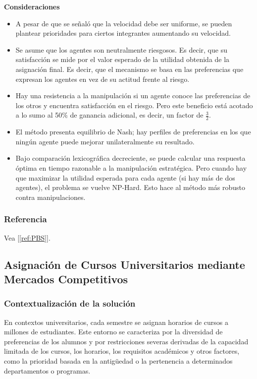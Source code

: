 \documentclass{article}
\begin{document}
\textbf{Consideraciones}

\begin{itemize}
  \item A pesar de que se señaló que la velocidad debe ser uniforme, se pueden plantear prioridades para
        ciertos integrantes aumentando su velocidad.
  \item Se asume que los agentes son neutralmente riesgosos. Es decir, que su satisfacción se mide 
        por el valor esperado de la utilidad obtenida de la asignación final. Es decir, que el mecanismo
        se basa en las preferencias que expresan los agentes en vez de su actitud frente al riesgo.
  \item Hay una resistencia a la manipulación si un agente conoce las preferencias de los otros
        y encuentra satisfacción en el riesgo. Pero este beneficio está acotado a lo sumo al 50\% de
        ganancia adicional, es decir, un factor de $\frac{3}{2}$.
  \item El método presenta equilibrio de Nash; hay perfiles de preferencias en los que ningún agente 
        puede mejorar unilateralmente su resultado.
  \item Bajo comparación lexicográfica decreciente, se puede calcular una respuesta óptima en tiempo 
        razonable a la manipulación estratégica. Pero cuando hay que maximizar la utilidad esperada
        para cada agente (si hay más de dos agentes), el problema se vuelve NP-Hard. Esto hace al 
        método más robusto contra manipulaciones.
\end{itemize}


\subsubsection{Referencia}
Vea [\ref{ref:PBS}].

\subsection{Asignación de Cursos Universitarios mediante Mercados Competitivos}

\subsubsection{Contextualización de la solución}

En contextos universitarios, cada semestre se asignan horarios de cursos a millones de estudiantes. Este entorno se caracteriza por la diversidad de preferencias de los alumnos y por restricciones severas derivadas de la capacidad limitada de los cursos, los horarios, los requisitos académicos y otros factores, como la prioridad basada en la antigüedad o la pertenencia a determinados departamentos o programas.
\end{document}
